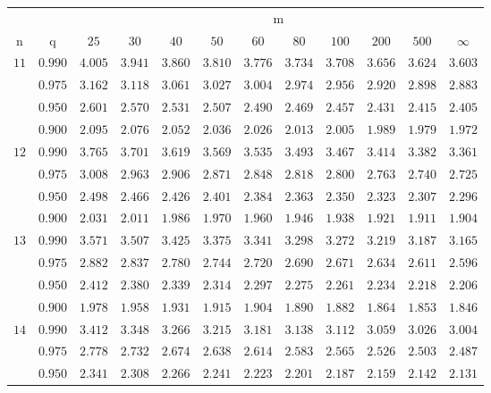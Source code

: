 \documentclass[11pt]{article}
\theoremstyle{definition}
\begin{document}
\begin{table}[H]
	\begin{tabularx}{\linewidth}{c | c | c c c c c c c c c c}
		& & \multicolumn{10}{c}{m}\\
		\cline{3-12}
		n & q & $25$ & $30$ & $40$ & $50$ & $60$ & $80$ & $100$ & $200$ & $500$ & $\infty$\\
		\hline
		$11$ & $0.990$ & $4.005$ & $3.941$ & $3.860$ & $3.810$ & $3.776$ & $3.734$ & $3.708$ & $3.656$ & $3.624$ & $3.603$ \\
		& $0.975$ & $3.162$ & $3.118$ & $3.061$ & $3.027$ & $3.004$ & $2.974$ & $2.956$ & $2.920$ & $2.898$ & $2.883$ \\
		& $0.950$ & $2.601$ & $2.570$ & $2.531$ & $2.507$ & $2.490$ & $2.469$ & $2.457$ & $2.431$ & $2.415$ & $2.405$ \\
		& $0.900$ & $2.095$ & $2.076$ & $2.052$ & $2.036$ & $2.026$ & $2.013$ & $2.005$ & $1.989$ & $1.979$ & $1.972$ \\
		$12$ & $0.990$ & $3.765$ & $3.701$ & $3.619$ & $3.569$ & $3.535$ & $3.493$ & $3.467$ & $3.414$ & $3.382$ & $3.361$ \\
		& $0.975$ & $3.008$ & $2.963$ & $2.906$ & $2.871$ & $2.848$ & $2.818$ & $2.800$ & $2.763$ & $2.740$ & $2.725$ \\
		& $0.950$ & $2.498$ & $2.466$ & $2.426$ & $2.401$ & $2.384$ & $2.363$ & $2.350$ & $2.323$ & $2.307$ & $2.296$ \\
		& $0.900$ & $2.031$ & $2.011$ & $1.986$ & $1.970$ & $1.960$ & $1.946$ & $1.938$ & $1.921$ & $1.911$ & $1.904$ \\
		$13$ & $0.990$ & $3.571$ & $3.507$ & $3.425$ & $3.375$ & $3.341$ & $3.298$ & $3.272$ & $3.219$ & $3.187$ & $3.165$ \\
		& $0.975$ & $2.882$ & $2.837$ & $2.780$ & $2.744$ & $2.720$ & $2.690$ & $2.671$ & $2.634$ & $2.611$ & $2.596$ \\
		& $0.950$ & $2.412$ & $2.380$ & $2.339$ & $2.314$ & $2.297$ & $2.275$ & $2.261$ & $2.234$ & $2.218$ & $2.206$ \\
		& $0.900$ & $1.978$ & $1.958$ & $1.931$ & $1.915$ & $1.904$ & $1.890$ & $1.882$ & $1.864$ & $1.853$ & $1.846$ \\
		$14$ & $0.990$ & $3.412$ & $3.348$ & $3.266$ & $3.215$ & $3.181$ & $3.138$ & $3.112$ & $3.059$ & $3.026$ & $3.004$ \\
		& $0.975$ & $2.778$ & $2.732$ & $2.674$ & $2.638$ & $2.614$ & $2.583$ & $2.565$ & $2.526$ & $2.503$ & $2.487$ \\
		& $0.950$ & $2.341$ & $2.308$ & $2.266$ & $2.241$ & $2.223$ & $2.201$ & $2.187$ & $2.159$ & $2.142$ & $2.131$ \\

\end{tabularx}
\end{table}
\end{document}
